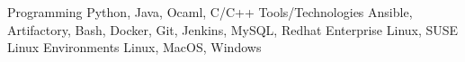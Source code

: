 

\begin{cvskills}


 \cvskill 
     {Programming} %
     {Python, Java, Ocaml, C/C++} %
 \cvskill
     {Tools/Technologies} %
     {Ansible, Artifactory, Bash, Docker, Git, Jenkins, MySQL, Redhat Enterprise Linux, SUSE Linux }
 \cvskill
     {Environments}  %
     {Linux, MacOS, Windows} %
    

\end{cvskills}
